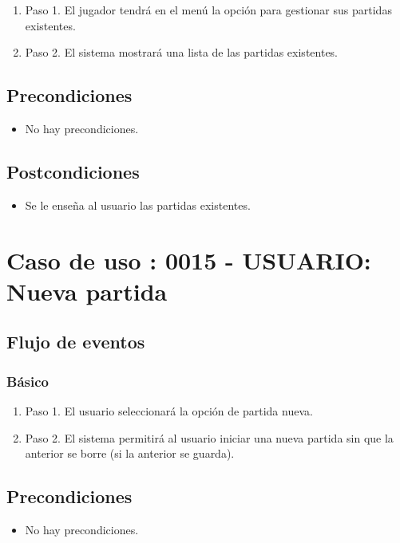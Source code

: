 \begin{enumerate}
\item Paso 1.
El jugador tendrá en el menú la opción para gestionar sus partidas existentes.
\item Paso 2.
El sistema mostrará una lista de las partidas existentes.
\end{enumerate}

\subsection{Precondiciones}
\begin{itemize}
\item No hay precondiciones.
\end{itemize}

\subsection{Postcondiciones}
\begin{itemize}
\item Se le enseña al usuario las partidas existentes. 
\end{itemize}



\section{Caso de uso : 0015 - USUARIO: Nueva partida}\label{sec:uc0}
\subsection{Flujo de eventos}
\subsubsection{Básico}

\begin{enumerate}
\item Paso 1.
El usuario seleccionará la opción de partida nueva. 
\item Paso 2.
El sistema permitirá al usuario iniciar una nueva partida sin que la anterior se borre (si la anterior se guarda). 
\end{enumerate}

\subsection{Precondiciones}
\begin{itemize}
\item No hay precondiciones.
\end{itemize}

